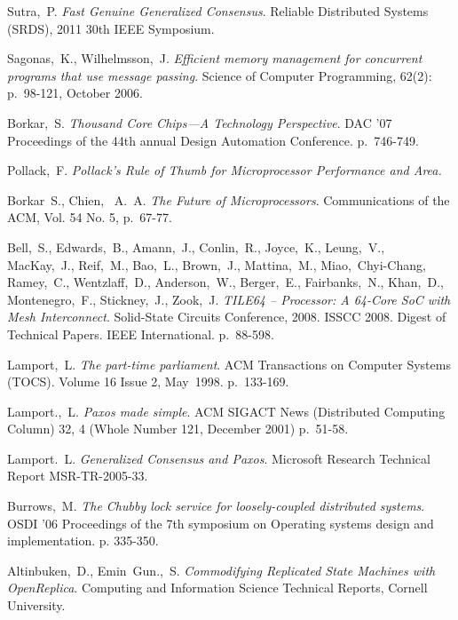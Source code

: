 \documentclass[english,11pt]{article}
\begin{document}
\clearpage
\begin{thebibliography}{99}

     Sutra,~P. \emph{Fast Genuine Generalized Consensus}. Reliable
        Distributed Systems (SRDS), 2011 30th IEEE Symposium.

     Sagonas,~K., Wilhelmsson,~J. \emph{Efficient memory
        management for concurrent programs that use message passing}. Science of
        Computer Programming, 62(2): p.~98-121, October 2006.

     Borkar,~S. \emph{Thousand Core Chips—A Technology
        Perspective}. DAC '07 Proceedings of the 44th annual Design Automation
        Conference. p.~746-749.

     Pollack,~F. \emph{Pollack's Rule of Thumb for
        Microprocessor Performance and Area.}

     Borkar~S., Chien,~ A.~A. \emph{The Future
        of Microprocessors}. Communications of the ACM, Vol. 54 No. 5, p.~67-77.

     Bell,~S., Edwards,~B., Amann,~J., Conlin,~R.,
        Joyce,~K., Leung,~V., MacKay,~J., Reif,~M., Bao,~L., Brown,~J.,
        Mattina,~M., Miao,~Chyi-Chang, Ramey,~C., Wentzlaff,~D.,
        Anderson,~W., Berger,~E., Fairbanks,~N., Khan,~D., Montenegro,~F.,
        Stickney,~J., Zook,~J. \emph{TILE64 -- Processor: A 64-Core SoC with
        Mesh Interconnect}. Solid-State Circuits Conference, 2008. ISSCC 2008.
        Digest of Technical Papers. IEEE International. p.~88-598.

     Lamport,~L. \emph{The part-time parliament}. ACM
        Transactions on Computer Systems (TOCS). Volume 16 Issue 2, May~1998.
        p.~133-169.

     Lamport.,~L. \emph{Paxos made simple}. ACM SIGACT
        News (Distributed Computing Column) 32, 4 (Whole Number 121, December
        2001) p.~51-58.

     Lamport.~L. \emph{Generalized Consensus and
        Paxos}. Microsoft Research Technical Report MSR-TR-2005-33.

     Burrows,~M. \emph{The Chubby lock service for
        loosely-coupled distributed systems}. OSDI '06 Proceedings of the 7th
        symposium on Operating systems design and implementation. p. 335-350.

     Altinbuken,~D., Emin~Gun.,~S. \emph{Commodifying
        Replicated State Machines with OpenReplica}. Computing and
        Information Science Technical Reports, Cornell University.


\end{thebibliography}
\end{document}
